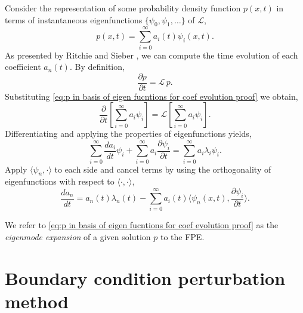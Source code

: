 \documentclass[11pt]{amsart}
\begin{document}
Consider the representation of some probability density function $p(x,t)$ in terms of instantaneous eigenfunctions $\{\psi_0,\psi_1,\dots \}$ of $\mathcal{L}$,
\begin{equation}
\label{eq:p in basis of eigen fucntions for coef evolution proof}
    p(x,t) = \sum_{i=0}^{\infty} a_i(t)\psi_i(x,t).
\end{equation}
As presented by Ritchie and Sieber \cite{ritchie_2016_early_warning,ritchie_sieber_2017_noise_rate_tipping}, we can compute the time evolution of each coefficient $a_n(t)$. By definition,
\begin{equation*}
    \frac{\partial p}{\partial t} = \mathcal{L}\,p.
\end{equation*}
Substituting \cref{eq:p in basis of eigen fucntions for coef evolution proof} we obtain,
\begin{equation*}
    \frac{\partial}{\partial t} \left[ \sum_{i=0}^{\infty} a_i\psi_i \right] = \mathcal{L}  \left[ \sum_{i=0}^{\infty} a_i\psi_i \right].
\end{equation*}
Differentiating and applying the properties of eigenfunctions yields,
\begin{equation*}
     \sum_{i=0}^{\infty}\frac{d a_i}{d t}\psi_i + \sum_{i=0}^{\infty} a_i\frac{\partial \psi_i}{\partial t} =  \sum_{i=0}^{\infty} a_i\lambda_i\psi_i.
\end{equation*}
Apply $\langle\psi_n,\cdot \rangle$ to each side and cancel terms by using the orthogonality of eigenfunctions with respect to $\langle\cdot,\cdot \rangle$,
\begin{equation}
    \label{eq:eigenmode expansion coef time evolution}
    \frac{da_n}{dt}  =  a_n(t)\lambda_n(t) - \sum_{i=0}^{\infty} a_i(t)\langle\psi_n(x,t), \frac{\partial \psi_i}{\partial t} \rangle.
\end{equation}

We refer to \cref{eq:p in basis of eigen fucntions for coef evolution proof} as the \emph{eigenmode expansion} of a given solution $p$ to the FPE.

\section{Boundary condition perturbation method}
\label{sec:boundary condition perturbation}
\end{document}
